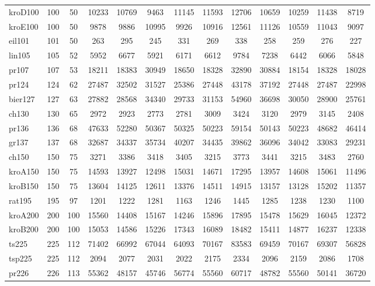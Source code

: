\documentclass[conference]{IEEEtran}
\begin{document}
\begin{table}[htbp]
{{\begin{tabular}{|l|c|c|c|c|c|c|c|c|c|c|c|c|}
kroD100 & 100 & 50 & 10233 & 10769 & 9463 & 11145 & 11593 & 12706 & 10659 & 10259 & 11438 & 8719 \\
kroE100 & 100 & 50 & 9878 & 9886 & 10995 & 9926 & 10916 & 12561 & 11126 & 10559 & 11043 & 9097 \\
eil101 & 101 & 50 & 263 & 295 & 245 & 331 & 269 & 338 & 258 & 259 & 276 & 227 \\
lin105 & 105 & 52 & 5952 & 6677 & 5921 & 6171 & 6612 & 9784 & 7238 & 6442 & 6066 & 5848 \\
pr107 & 107 & 53 & 18211 & 18383 & 30949 & 18650 & 18328 & 32890 & 30884 & 18154 & 18328 & 18028 \\
pr124 & 124 & 62 & 27487 & 32502 & 31527 & 25386 & 27448 & 43178 & 37192 & 27448 & 27487 & 22998 \\
bier127 & 127 & 63 & 27882 & 28568 & 34340 & 29733 & 31153 & 54960 & 36698 & 30050 & 28900 & 25761 \\
ch130 & 130 & 65 & 2972 & 2923 & 2773 & 2781 & 3009 & 3424 & 3120 & 2979 & 3145 & 2408 \\
pr136 & 136 & 68 & 47633 & 52280 & 50367 & 50325 & 50223 & 59154 & 50143 & 50223 & 48682 & 46414 \\
gr137 & 137 & 68 & 32687 & 34337 & 35734 & 40207 & 34435 & 39862 & 36096 & 34042 & 33083 & 29231 \\
ch150 & 150 & 75 & 3271 & 3386 & 3418 & 3405 & 3215 & 3773 & 3441 & 3215 & 3483 & 2760 \\
kroA150 & 150 & 75 & 14593 & 13927 & 12498 & 15031 & 14671 & 17295 & 13957 & 14608 & 15061 & 11496 \\
kroB150 & 150 & 75 & 13604 & 14125 & 12611 & 13376 & 14511 & 14915 & 13157 & 13128 & 15202 & 11357 \\
rat195 & 195 & 97 & 1201 & 1222 & 1281 & 1163 & 1246 & 1445 & 1285 & 1238 & 1230 & 1100 \\
kroA200 & 200 & 100 & 15560 & 14408 & 15167 & 14246 & 15896 & 17895 & 15478 & 15629 & 16045 & 12372 \\
kroB200 & 200 & 100 & 15053 & 14586 & 15226 & 17343 & 16089 & 18482 & 15411 & 14877 & 16237 & 12338 \\
ts225 & 225 & 112 & 71402 & 66992 & 67044 & 64093 & 70167 & 83583 & 69459 & 70167 & 69307 & 56828 \\
tsp225 & 225 & 112 & 2094 & 2077 & 2031 & 2022 & 2175 & 2334 & 2096 & 2159 & 2086 & 1708 \\
pr226 & 226 & 113 & 55362 & 48157 & 45746 & 56774 & 55560 & 60717 & 48782 & 55560 & 50141 & 36720 \\

\end{tabular}}}
\end{table}
\end{document}
